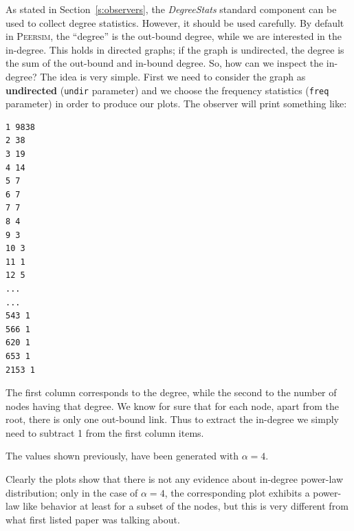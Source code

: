 \documentclass[a4paper,11pt]{article}
\newcommand{\id}[1]{{\scshape\small #1}}
\newcommand{\psim}{\id{Peersim}}
\begin{document}
As stated in Section~\ref{s:observers}, the \emph{DegreeStats} standard
component can be used to collect degree statistics. However, it should 
be used carefully. By default in \psim,
the ``degree'' is the out-bound degree, while we are interested in the
in-degree. This holds in directed graphs; if the graph is undirected,
the degree is the sum of the out-bound and in-bound degree. So, how
can we inspect the in-degree? The idea is very simple. First we need
to consider the graph as \textbf{undirected} (\texttt{undir}
parameter) and we choose the frequency statistics (\texttt{freq}
parameter) in order to produce our plots. The observer will
print something like:

\footnotesize
\begin{verbatim}
1 9838
2 38
3 19
4 14
5 7
6 7
7 7
8 4
9 3
10 3
11 1
12 5
...
...
543 1
566 1
620 1
653 1
2153 1
\end{verbatim}
\normalsize

The first column corresponds to the degree, while the second to the
number of nodes having that degree. We know for sure that for each node, apart from the
root, there is only one out-bound link. Thus to extract the in-degree
we simply need to subtract 1 from the first column items.

The values shown previously, have been generated with $\alpha = 4$. 



Clearly the plots show that there is not any evidence about in-degree 
power-law distribution; only in the case of $\alpha = 4$, the corresponding 
plot exhibits a power-law like behavior at least for a subset of the nodes, 
but this is very different from what first listed paper was talking about.
\end{document}
